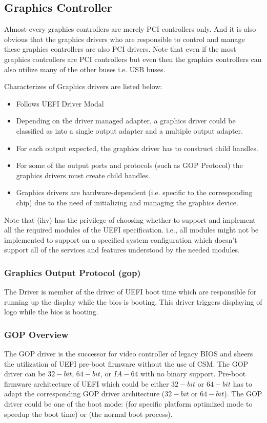 \subsection{Graphics Controller}
Almost every graphics controllers are merely PCI controllers only. And it is also obvious that the graphics drivers who are responsible to control and manage these graphics controllers are also PCI drivers. Note that even if the most graphics controllers are PCI controllers but even then the graphics controllers can also utilize many of the other buses i.e. USB buses. 

Characterizes of Graphics drivers are listed below:
\begin{itemize}
	\item Follows UEFI Driver Modal
	\item Depending on the driver managed adapter, a graphics driver could be classified as into a single output adapter and a multiple output adapter.
	\item For each output expected, the graphics driver has to construct child handles.
	\item For some of the output ports and protocols (such as GOP Protocol) the graphics drivers must create child handles.
	\item Graphics drivers are hardware-dependent (i.e. specific to the corresponding chip) due to the need of initializing and managing the graphics device.
\end{itemize}
Note that (\gls{ihv}) has the privilege of choosing whether to support and implement all the required modules of the UEFI specification. i.e., all modules might not be implemented to support on a specified system configuration which doesn't support all of the services and features understood by the needed modules.

\subsubsection{Graphics Output Protocol (\gls{gop})}
The  Driver is member of the driver of UEFI boot time which are responsible for running up the display while the bios is booting. This driver triggers displaying of logo while the bios is booting.

\subsubsection{GOP Overview}
The GOP driver is the successor for video controller of legacy BIOS and sheers the utilization of UEFI pre-boot firmware without the use of CSM. The GOP driver can be $ 32-bit $, $ 64-bit $, or $ IA-64 $ with no binary support. Pre-boot firmware architecture of UEFI which could be either $ 32-bit $ or $ 64-bit $ has to adapt the corresponding GOP driver architecture ($ 32-bit $ or $ 64-bit $). The GOP driver could be one of the boot mode:  (for specific platform optimized mode to speedup the boot time) or  (the normal boot process).

